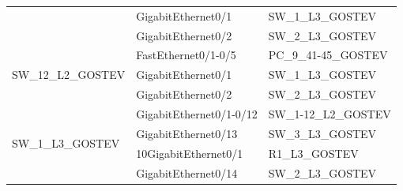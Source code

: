 \documentclass[14pt, a4paper]{extarticle}
\numberwithin{equation}{section}
\begin{document}
\begin{table}[H]
\begin{tabular}{|l|l|l|}
                                    & GigabitEthernet0/1       & SW\_1\_L3\_GOSTEV             \\ \cline{2-3} 
                                    & GigabitEthernet0/2       & SW\_2\_L3\_GOSTEV             \\ \hline
\multirow{3}{*}{SW\_12\_L2\_GOSTEV} & FastEthernet0/1-0/5      & PC\_9\_41-45\_GOSTEV          \\ \cline{2-3} 
                                    & GigabitEthernet0/1       & SW\_1\_L3\_GOSTEV             \\ \cline{2-3} 
                                    & GigabitEthernet0/2       & SW\_2\_L3\_GOSTEV             \\ \hline
\multirow{4}{*}{SW\_1\_L3\_GOSTEV}  & GigabitEthernet0/1-0/12  & SW\_1-12\_L2\_GOSTEV          \\ \cline{2-3} 
                                    & GigabitEthernet0/13      & SW\_3\_L3\_GOSTEV             \\ \cline{2-3} 
                                    & 10GigabitEthernet0/1     & R1\_L3\_GOSTEV                \\ \cline{2-3} 
                                    & GigabitEthernet0/14      & SW\_2\_L3\_GOSTEV             \\ 
\end{tabular}
\end{table}
\end{document}
